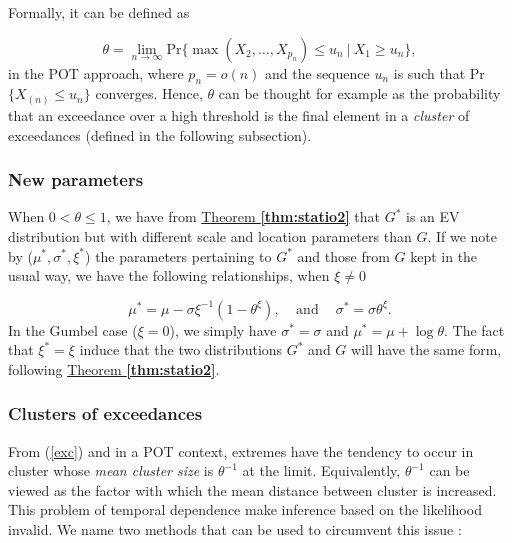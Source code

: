 Formally, it can be defined as

\begin{equation}\label{exc}
\theta=\displaystyle{\lim_{n \to \infty}}\text{Pr}\big\{\max(X_2,\dots,X_{p_n})\leq u_n\ | \ X_1\geq u_n\big\},
\end{equation}
in the POT approach, where $p_n=o(n)$ and the sequence $u_n$ is such that Pr$\big\{X_{(n)} \leq u_n\big\}$ converges.
Hence, $\theta$ can be thought for example as the probability that an exceedance over a high threshold is the final element in a \textit{cluster} of exceedances (defined in the following subsection).



\subsubsection*{New parameters}
 When $0<\theta\leq 1$, we have from \hyperref[thm:statio2]{Theorem \textbf{\ref{thm:statio2}}} that $G^*$ is an EV distribution but with different scale and location parameters than $G$. If we note by ($\mu^*,\sigma^*,\xi^*$) the parameters pertaining to $G^*$ and those from $G$ kept in the usual way, we have the following relationships, when $\xi\neq 0$

\begin{equation}
\mu^* = \mu-\sigma\xi^{-1}(1-\theta^{\xi}), \ \ \ \   \ \text{and} \ \quad \sigma^*=\sigma\theta^{\xi}.
\end{equation}
In the Gumbel case ($\xi=0$), we simply have $\sigma^*=\sigma$ and $\mu^*=\mu+\log\theta$.
The fact that $\xi^*=\xi$ induce that the two distributions $G^*$ and $G$ will have the same form, following \hyperref[thm:statio2]{Theorem \textbf{\ref{thm:statio2}}}.



\subsubsection*{Clusters of exceedances}

 From (\ref{exc}) and in a POT context, extremes have the tendency to occur in cluster whose \emph{mean cluster size} is $\theta^{-1}$ at the limit. Equivalently, $\theta^{-1}$ can be viewed as the factor with which the mean distance between cluster is increased.
This problem of temporal dependence make inference based on the likelihood invalid.
We name two methods that can be used to circumvent this issue : 

